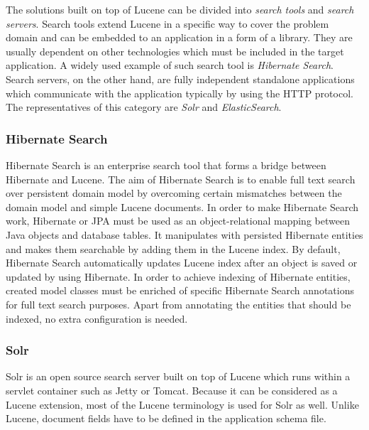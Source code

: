The solutions built on top of Lucene can be divided into \textit{search tools} and \textit{search servers}. 
Search tools extend Lucene in a specific way to cover the problem domain and can be embedded to an application in a form of a library. 
They are usually dependent on other technologies which must be included in the target application. 
A widely used example of such search tool is \textit{Hibernate Search}.
Search servers, on the other hand, are fully independent standalone applications which communicate with the application typically by using the HTTP protocol. The representatives of this category are \textit{Solr} and \textit{ElasticSearch}.


\subsubsection{Hibernate Search}

Hibernate Search \cite{HibernateSearchHome} is an enterprise search tool that forms a bridge between Hibernate and Lucene. 
The aim of Hibernate Search is to enable full text search over persistent domain model by overcoming certain mismatches between the domain model and simple Lucene documents.
In order to make Hibernate Search work, Hibernate or JPA must be used as an object-relational mapping between Java objects and database tables. 
It manipulates with persisted Hibernate entities and makes them searchable by adding them in the Lucene index. 
By default, Hibernate Search automatically updates Lucene index after an object is saved or updated by using Hibernate.
In order to achieve indexing of Hibernate entities, created model classes must be enriched of specific Hibernate Search annotations for full text search purposes.
Apart from annotating the entities that should be indexed, no extra configuration is needed. 


\subsubsection{Solr}

Solr \cite{SolrHome} is an open source search server built on top of Lucene which runs within a servlet container such as Jetty or Tomcat.
Because it can be considered as a Lucene extension, most of the Lucene terminology is used for Solr as well. 
Unlike Lucene, document fields have to be defined in the application schema file.

